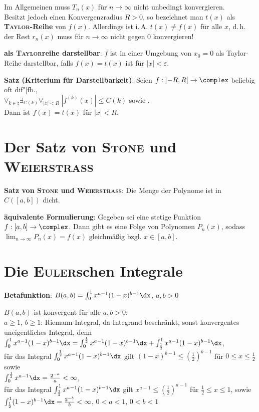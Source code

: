 Im Allgemeinen muss $T_n(x)$ für $n \to \infty$ nicht unbedingt
konvergieren. \\
Besitzt jedoch  einen Konvergenzradius $R > 0$,
so bezeichnet man $t(x)$ als \textbf{\textsc{Taylor}-Reihe} von $f(x)$.
Allerdings ist i.\,A. $t(x) \not= f(x)$ für alle $x$, d.\,h.
der Rest $r_n(x)$ muss für $n \to \infty$ nicht gegen $0$ konvergieren!

\textbf{als \textsc{Taylor}reihe darstellbar}:
$f$ ist in einer Umgebung von $x_0 = 0$ als Taylor-Reihe darstellbar,
falls $f(x) = t(x)$ ist für $|x| < \varepsilon$.

\textbf{Satz (Kriterium für Darstellbarkeit)}:
Seien $f: \left]-R,R\right[ \rightarrow \complex$ beliebig oft dif"|fb., \\
$\forall_{k \in \natural} \exists_{C(k)} \forall_{|x| < R}\;
|f^{(k)}(x)| \le C(k)$ sowie
. \\
Dann ist $f(x) = t(x)$ für $|x| < R$.

\section{%
    Der Satz von \textsc{Stone} und \textsc{Weierstraß}%
}

\textbf{Satz von \textsc{Stone} und \textsc{Weierstraß}}:
Die Menge der Polynome ist in $C([a,b])$ dicht.

\textbf{äquivalente Formulierung}:
Gegeben sei eine stetige Funktion $f: [a,b] \rightarrow \complex$.
Dann gibt es eine Folge von Polynomen $P_n(x)$, sodass
$\lim_{n \to \infty} P_n(x) = f(x)$ gleichmäßig bzgl. $x \in [a,b]$.

\section{%
    Die \textsc{Euler}schen Integrale%
}

\textbf{Betafunktion}:
$B(a, b) = \int_0^1 x^{a-1} (1 - x)^{b-1} \dx$, $a, b > 0$

$B(a, b)$ ist konvergent für alle $a, b > 0$: \\
$a \ge 1$, $b \ge 1$: Riemann-Integral, da Integrand beschränkt,
sonst konvergentes uneigentliches Integral, denn
$\int_0^1 x^{a-1} (1 - x)^{b-1} \dx =
\int_0^{\frac{1}{2}} x^{a-1} (1 - x)^{b-1} \dx +
\int_{\frac{1}{2}}^1 x^{a-1} (1 - x)^{b-1} \dx$, \\
für das Integral $\int_0^{\frac{1}{2}} x^{a-1} (1 - x)^{b-1} \dx$
gilt $(1 - x)^{b-1} \le \left(\frac{1}{2}\right)^{b-1}$ für
$0 \le x \le \frac{1}{2}$ sowie \\
$\int_0^{\frac{1}{2}} x^{a-1} \dx = \frac{2^{-a}}{a} < \infty$, \\
für das Integral $\int_{\frac{1}{2}}^1 x^{a-1} (1 - x)^{b-1} \dx$
gilt $x^{a-1} \le \left(\frac{1}{2}\right)^{a-1}$ für
$\frac{1}{2} \le x \le 1$, sowie \\
$\int_{\frac{1}{2}}^1 (1 - x)^{b-1} \dx =
\frac{2^{-b}}{b} < \infty$, $0 < a < 1$, $0 < b < 1$

